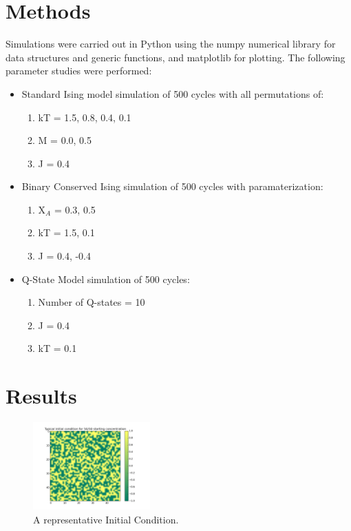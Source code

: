 \documentclass{report}
\begin{document}
    \section{Methods}
    Simulations were carried out in Python using the numpy numerical library for data structures and generic functions, and matplotlib for plotting. The following parameter studies were performed:
        \begin{itemize}
            \item{Standard Ising model simulation of 500 cycles with all permutations of:}
                \begin{enumerate}
                    \item{kT = 1.5, 0.8, 0.4, 0.1}
                    \item{M = 0.0, 0.5}
                    \item{J = 0.4}
                \end{enumerate}

            \item{Binary Conserved Ising simulation of 500 cycles with paramaterization:}
            \begin{enumerate}
                \item{X$_A$ = 0.3, 0.5}
                \item{kT = 1.5, 0.1}
                \item{J = 0.4, -0.4}
            \end{enumerate}

            \item{Q-State Model simulation of 500 cycles:}
            \begin{enumerate}
                \item{Number of Q-states = 10}
                \item{J = 0.4}
                \item{kT = 0.1}
            \end{enumerate}
        \end{itemize}

    \section{Results}


        \begin{figure}[!htb]
            \label{fig:initial}
            \centering
            \includegraphics[width=0.4\textwidth]{Initial.png}
            \caption{A representative Initial Condition.}
        \end{figure}
\end{document}
